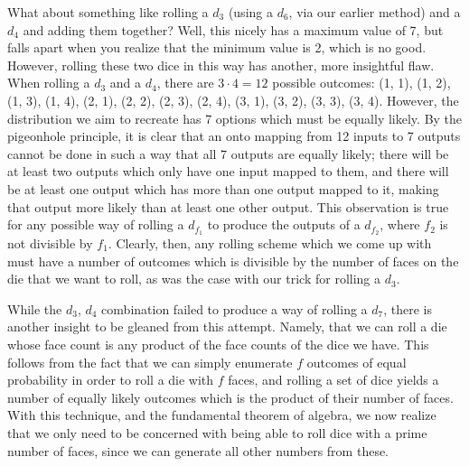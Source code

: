 \documentclass{article}
\begin{document}
\par What about something like rolling a $d_3$ (using a $d_6$, via our earlier method) and a $d_4$ and adding them together?
Well, this nicely has a maximum value of 7, but falls apart when you realize that the minimum value is 2, which is no good.
However, rolling these two dice in this way has another, more insightful flaw.
When rolling a $d_3$ and a $d_4$, there are $3 \cdot 4 = 12$ possible outcomes: (1, 1), (1, 2), (1, 3), (1, 4), (2, 1), (2, 2), (2, 3), (2, 4), (3, 1), (3, 2), (3, 3), (3, 4).
However, the distribution we aim to recreate has 7 options which must be equally likely.
By the pigeonhole principle, it is clear that an onto mapping from 12 inputs to 7 outputs cannot be done in such a way that all 7 outputs are equally likely; there will be at least two outputs which only have one input mapped to them, and there will be at least one output which has more than one output mapped to it, making that output more likely than at least one other output.
This observation is true for any possible way of rolling a $d_{f_1}$ to produce the outputs of a $d_{f_2}$, where $f_2$ is not divisible by $f_1$.
Clearly, then, any rolling scheme which we come up with must have a number of outcomes which is divisible by the number of faces on the die that we want to roll, as was the case with our trick for rolling a $d_3$.

\par While the $d_3$, $d_4$ combination failed to produce a way of rolling a $d_7$, there is another insight to be gleaned from this attempt.
Namely, that we can roll a die whose face count is any product of the face counts of the dice we have. 
This follows from the fact that we can simply enumerate $f$ outcomes of equal probability in order to roll a die with $f$ faces, and rolling a set of dice yields a number of equally likely outcomes which is the product of their number of faces.
With this technique, and the fundamental theorem of algebra, we now realize that we only need to be concerned with being able to roll dice with a prime number of faces, since we can generate all other numbers from these.
\end{document}
